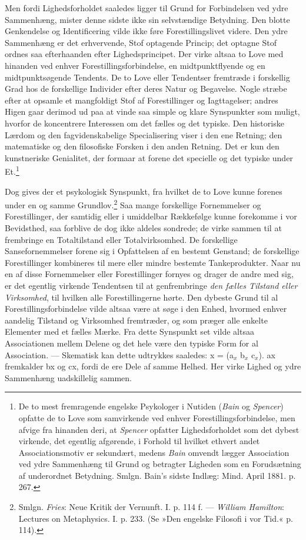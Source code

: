 \documentclass[12pt,a4paper,openany]{book}
\newcommand{\opage}[1]{\marginnote{\footnotesize\textit{[#1]}}}
\begin{document}
Men fordi Lighedsforholdet saaledes ligger til Grund for Forbindelsen
ved ydre Sammenhæng, mister denne sidste ikke sin selvstændige
Betydning. Den blotte Genkendelse og Identificering vilde ikke føre
Forestillingslivet videre. Den ydre Sammenhæng er det erhvervende, Stof
optagende Princip; det optagne Stof ordnes saa efterhaanden efter
Lighedsprincipet.
\opage{193}Der virke altsaa to Love med hinanden ved enhver
Forestillingsforbindelse, en midtpunktflyende og en midtpunktsøgende
Tendents. De to Love eller Tendentser fremtræde i forskellig Grad hos de
forskellige Individer efter deres Natur og Begavelse. Nogle stræbe efter
at opsamle et mangfoldigt Stof af Forestillinger og Iagttagelser; andres
Higen gaar derimod ud paa at vinde saa simple og klare Synspunkter som
muligt, hvorfor de koncentrere Interessen om det fælles og det typiske.
Den historiske Lærdom og den fagvidenskabelige Specialisering viser i
den ene Retning; den matematiske og den filosofiske Forsken i den anden
Retning. Det er kun den kunstneriske Genialitet, der formaar at forene
det specielle og det typiske under Et.\footnote[1]{De to mest
fremragende engelske Psykologer i Nutiden (\emph{Bain} og
\emph{Spencer}) opfatte de to Love som samvirkende ved enhver
Forestillingsforbindelse, men afvige fra hinanden deri, at
\emph{Spencer} opfatter Lighedsforholdet som det dybest virkende, det
egentlig afgørende, i Forhold til hvilket ethvert andet
Associationsmotiv er sekundært, medens \emph{Bain} omvendt lægger
Association ved ydre Sammenhæng til Grund og betragter Ligheden som en
Forudsætning af underordnet Betydning. Smlgn. Bain’s sidste Indlæg:
Mind. April 1881. p. 267.}

Dog gives der et psykologisk Synspunkt, fra hvilket de to Love kunne
forenes under en og samme Grundlov.\footnote[2]{Smlgn. \emph{Fries}:
Neue Kritik der Vernunft. I. p. 114 f. --- \emph{William Hamilton}:
Lectures on Metaphysics. I. p. 233. (Se »Den engelske Filosofi i vor
Tid.« p. 114).} Saa mange forskellige Fornemmelser og Forestillinger,
der samtidig eller i umiddelbar Rækkefølge kunne forekomme i vor
Bevidsthed, saa forblive de dog ikke aldeles sondrede; de virke sammen
til at frembringe en Totaltilstand eller Totalvirksomhed. De forskellige
Sansefornemmelser forene sig i Opfattelsen af en bestemt Genstand; de
forskellige Forestillinger kombineres til mere eller mindre bestemte
Tankeprodukter. Naar nu en af disse Fornemmelser eller Forestillinger
fornyes og drager de andre med sig, er det egentlig virkende Tendentsen
til at genfrembringe \emph{den fælles Tilstand eller Virksomhed}, til
hvilken alle Forestillingerne hørte. Den dybeste Grund til al
Forestillingsforbindelse vilde altsaa være at søge i den Enhed, hvormed
enhver aandelig Tilstand og Virksomhed fremtræder,
\opage{194}og som præger alle enkelte Elementer med et fælles Mærke. Fra
dette Synspunkt set vilde altsaa Associationen mellem Delene og det hele
være den typiske Form for al Association. --- Skematisk kan dette
udtrykkes saaledes: x = (a$_{x}$ b$_{x}$ c$_{x}$). ax fremkalder bx og
cx, fordi de ere Dele af samme Helhed. Her virke Lighed og ydre
Sammenhæng uadskillelig sammen.
\end{document}
